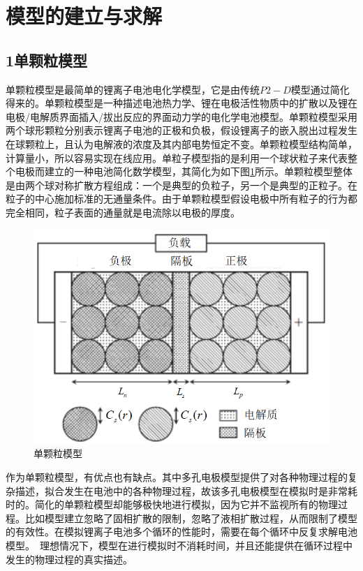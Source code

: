 \documentclass[12pt]{ctexart}%
\begin{document}
\section{模型的建立与求解}
\subsection{1单颗粒模型}
单颗粒模型是最简单的锂离子电池电化学模型，它是由传统$P2-D$模型\cite{Doyle1993Modeling}通过简化得来的。单颗粒模型是一种描述电池热力学、锂在电极活性物质中的扩散以及锂在电极/电解质界面插入/拔出反应的界面动力学的电化学电池模型。单颗粒模型采用两个球形颗粒分别表示锂离子电池的正极和负极，假设锂离子的嵌入脱出过程发生在球颗粒上，且认为电解液的浓度及其内部电势恒定不变。单颗粒模型结构简单，计算量小，所以容易实现在线应用。单粒子模型指的是利用一个球状粒子来代表整个电极而建立的一种电池简化数学模型，其简化为如下图\ref{a}所示。单颗粒模型整体是由两个球对称扩散方程组成：一个是典型的负粒子，另一个是典型的正粒子。在粒子的中心施加标准的无通量条件。由于单颗粒模型假设电极中所有粒子的行为都完全相同，粒子表面的通量就是电流除以电极的厚度。

\begin{figure}[h]
	\centering
	\includegraphics[scale = 0.4]{1}
	\caption{单颗粒模型}
	\label{a}
\end{figure}

作为单颗粒模型\cite{yuan2001determination}，有优点也有缺点。其中多孔电极模型提供了对各种物理过程的复杂描述，拟合发生在电池中的各种物理过程，故该多孔电极模型在模拟时是非常耗时的。简化的单颗粒模型却能够极快地进行模拟，因为它并不监视所有的物理过程。比如模型建立忽略了固相扩散的限制，忽略了液相扩散过程，从而限制了模型的有效性。在模拟锂离子电池多个循环的性能时，需要在每个循环中反复求解电池模型。 理想情况下，模型在进行模拟时不消耗时间，并且还能提供在循环过程中发生的物理过程的真实描述。
\end{document}
